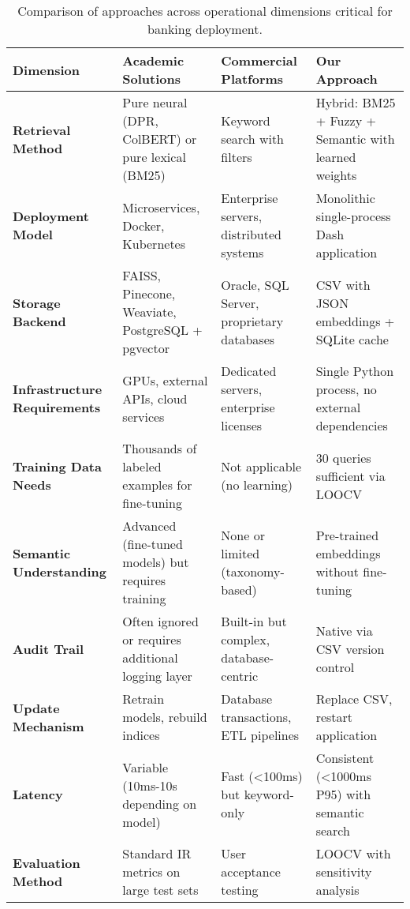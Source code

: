 \begin{table}[!htbp]
\centering
\small
\begin{tabular}{p{3cm}p{4cm}p{4cm}p{3.5cm}}
\toprule
\textbf{Dimension} & \textbf{Academic Solutions} & \textbf{Commercial Platforms} & \textbf{Our Approach} \\
\midrule
\textbf{Retrieval Method} & 
Pure neural (DPR, ColBERT) or pure lexical (BM25) & 
Keyword search with filters & 
Hybrid: BM25 + Fuzzy + Semantic with learned weights \\
\addlinespace

\textbf{Deployment Model} & 
Microservices, Docker, Kubernetes & 
Enterprise servers, distributed systems & 
Monolithic single-process Dash application \\
\addlinespace

\textbf{Storage Backend} & 
FAISS, Pinecone, Weaviate, PostgreSQL + pgvector & 
Oracle, SQL Server, proprietary databases & 
CSV with JSON embeddings + SQLite cache \\
\addlinespace

\textbf{Infrastructure Requirements} & 
GPUs, external APIs, cloud services & 
Dedicated servers, enterprise licenses & 
Single Python process, no external dependencies \\
\addlinespace

\textbf{Training Data Needs} & 
Thousands of labeled examples for fine-tuning & 
Not applicable (no learning) & 
30 queries sufficient via LOOCV \\
\addlinespace

\textbf{Semantic Understanding} & 
Advanced (fine-tuned models) but requires training & 
None or limited (taxonomy-based) & 
Pre-trained embeddings without fine-tuning \\
\addlinespace

\textbf{Audit Trail} & 
Often ignored or requires additional logging layer & 
Built-in but complex, database-centric & 
Native via CSV version control \\
\addlinespace

\textbf{Update Mechanism} & 
Retrain models, rebuild indices & 
Database transactions, ETL pipelines & 
Replace CSV, restart application \\
\addlinespace

\textbf{Latency} & 
Variable (10ms-10s depending on model) & 
Fast (<100ms) but keyword-only & 
Consistent (<1000ms P95) with semantic search \\
\addlinespace

\textbf{Evaluation Method} & 
Standard IR metrics on large test sets & 
User acceptance testing & 
LOOCV with sensitivity analysis \\
\bottomrule
\end{tabular}
\caption{Comparison of approaches across operational dimensions critical for banking deployment.}\label{tab:related-work-comparison}
\end{table}

